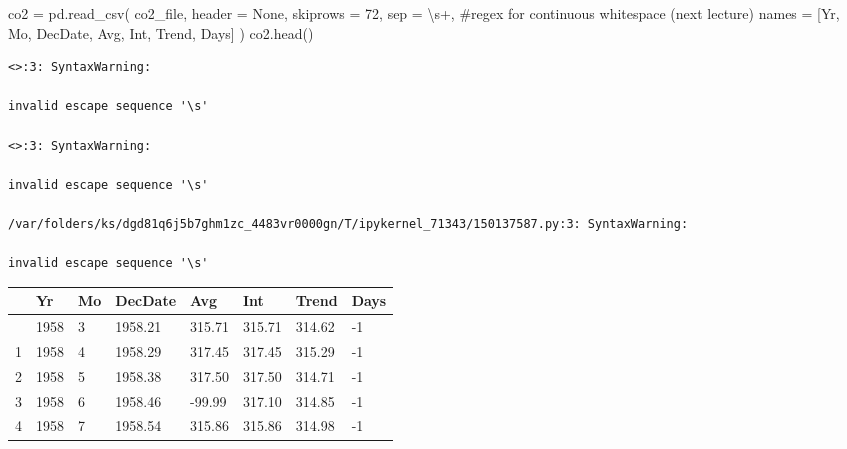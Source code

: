 \documentclass[
  letterpaper,
  DIV=11,
  numbers=noendperiod]{scrreprt}
\newenvironment{Shaded}{\begin{snugshade}}{\end{snugshade}}
\newcommand{\CommentTok}[1]{\textcolor[rgb]{0.37,0.37,0.37}{#1}}
\newcommand{\DecValTok}[1]{\textcolor[rgb]{0.68,0.00,0.00}{#1}}
\newcommand{\NormalTok}[1]{\textcolor[rgb]{0.00,0.23,0.31}{#1}}
\newcommand{\OperatorTok}[1]{\textcolor[rgb]{0.37,0.37,0.37}{#1}}
\newcommand{\StringTok}[1]{\textcolor[rgb]{0.13,0.47,0.30}{#1}}
\newcommand{\VariableTok}[1]{\textcolor[rgb]{0.07,0.07,0.07}{#1}}
\begin{document}
\begin{Shaded}
\begin{Highlighting}[]
\NormalTok{co2 }\OperatorTok{=}\NormalTok{ pd.read\_csv(}
\NormalTok{    co2\_file, header }\OperatorTok{=} \VariableTok{None}\NormalTok{, skiprows }\OperatorTok{=} \DecValTok{72}\NormalTok{,}
\NormalTok{    sep }\OperatorTok{=} \StringTok{\textquotesingle{}\textbackslash{}s+\textquotesingle{}}\NormalTok{, }\CommentTok{\#regex for continuous whitespace (next lecture)}
\NormalTok{    names }\OperatorTok{=}\NormalTok{ [}\StringTok{\textquotesingle{}Yr\textquotesingle{}}\NormalTok{, }\StringTok{\textquotesingle{}Mo\textquotesingle{}}\NormalTok{, }\StringTok{\textquotesingle{}DecDate\textquotesingle{}}\NormalTok{, }\StringTok{\textquotesingle{}Avg\textquotesingle{}}\NormalTok{, }\StringTok{\textquotesingle{}Int\textquotesingle{}}\NormalTok{, }\StringTok{\textquotesingle{}Trend\textquotesingle{}}\NormalTok{, }\StringTok{\textquotesingle{}Days\textquotesingle{}}\NormalTok{]}
\NormalTok{)}
\NormalTok{co2.head()}
\end{Highlighting}
\end{Shaded}

\begin{verbatim}
<>:3: SyntaxWarning:

invalid escape sequence '\s'

<>:3: SyntaxWarning:

invalid escape sequence '\s'

/var/folders/ks/dgd81q6j5b7ghm1zc_4483vr0000gn/T/ipykernel_71343/150137587.py:3: SyntaxWarning:

invalid escape sequence '\s'
\end{verbatim}

\begin{longtable}[]{@{}llllllll@{}}
\toprule\noalign{}
& Yr & Mo & DecDate & Avg & Int & Trend & Days \\
\midrule\noalign{}
\endhead
\bottomrule\noalign{}
\endlastfoot
0 & 1958 & 3 & 1958.21 & 315.71 & 315.71 & 314.62 & -1 \\
1 & 1958 & 4 & 1958.29 & 317.45 & 317.45 & 315.29 & -1 \\
2 & 1958 & 5 & 1958.38 & 317.50 & 317.50 & 314.71 & -1 \\
3 & 1958 & 6 & 1958.46 & -99.99 & 317.10 & 314.85 & -1 \\
4 & 1958 & 7 & 1958.54 & 315.86 & 315.86 & 314.98 & -1 \\
\end{longtable}
\end{document}
